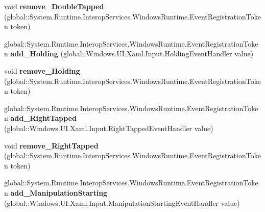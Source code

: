 \begin{DoxyCompactItemize}
\mbox{\label{interface_windows_1_1_u_i_1_1_xaml_1_1_i_u_i_element_ab7e8271e8ceb0cc5ca0b7bb3423f726f}} 
void {\bfseries remove\+\_\+\+Double\+Tapped} (global\+::\+System.\+Runtime.\+Interop\+Services.\+Windows\+Runtime.\+Event\+Registration\+Token token)
\item 
\mbox{\label{interface_windows_1_1_u_i_1_1_xaml_1_1_i_u_i_element_aa8c0e6b4397f0226baab3ec71083abba}} 
global\+::\+System.\+Runtime.\+Interop\+Services.\+Windows\+Runtime.\+Event\+Registration\+Token {\bfseries add\+\_\+\+Holding} (global\+::\+Windows.\+U\+I.\+Xaml.\+Input.\+Holding\+Event\+Handler value)
\item 
\mbox{\label{interface_windows_1_1_u_i_1_1_xaml_1_1_i_u_i_element_a731b5111082558a2945d799084cfbd79}} 
void {\bfseries remove\+\_\+\+Holding} (global\+::\+System.\+Runtime.\+Interop\+Services.\+Windows\+Runtime.\+Event\+Registration\+Token token)
\item 
\mbox{\label{interface_windows_1_1_u_i_1_1_xaml_1_1_i_u_i_element_ae3a5c2e71c2ae0d8a2d7ce2beb34673e}} 
global\+::\+System.\+Runtime.\+Interop\+Services.\+Windows\+Runtime.\+Event\+Registration\+Token {\bfseries add\+\_\+\+Right\+Tapped} (global\+::\+Windows.\+U\+I.\+Xaml.\+Input.\+Right\+Tapped\+Event\+Handler value)
\item 
\mbox{\label{interface_windows_1_1_u_i_1_1_xaml_1_1_i_u_i_element_a3582ef21b0d8aa47e220b343772155be}} 
void {\bfseries remove\+\_\+\+Right\+Tapped} (global\+::\+System.\+Runtime.\+Interop\+Services.\+Windows\+Runtime.\+Event\+Registration\+Token token)
\item 
\mbox{\label{interface_windows_1_1_u_i_1_1_xaml_1_1_i_u_i_element_a893f1fc019c5b01a9edcf81dbae7fb71}} 
global\+::\+System.\+Runtime.\+Interop\+Services.\+Windows\+Runtime.\+Event\+Registration\+Token {\bfseries add\+\_\+\+Manipulation\+Starting} (global\+::\+Windows.\+U\+I.\+Xaml.\+Input.\+Manipulation\+Starting\+Event\+Handler value)
\item 
\mbox{\label{interface_windows_1_1_u_i_1_1_xaml_1_1_i_u_i_element_aacad93dba45c725c051fd835e8599cc8}} 

\end{DoxyCompactItemize}
